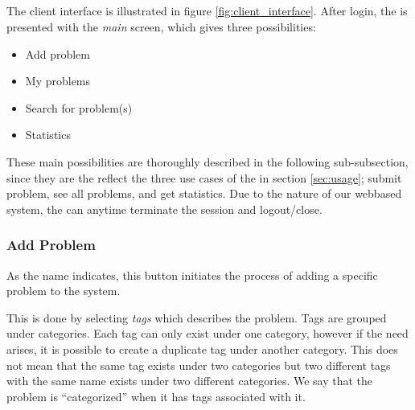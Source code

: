 \subsection{\cinterface}
\label{sec:client_interface}

The client interface is illustrated in figure \ref{fig:client_interface}.
After login, the \aclient[] is presented with the \textit{main} screen, which gives three possibilities:
\begin{itemize}
	\item Add problem
	\item My problems
	\item Search for problem(s)
	\item Statistics
\end{itemize}

These main possibilities are thoroughly described in the following sub-subsection, since they are the reflect the three use cases of the \aclient[] in section \ref{sec:usage}; submit problem, see all problems, and get statistics.
Due to the nature of our webbased system, the \aclient[] can anytime terminate the session and logout/close.

\subsubsection{Add Problem}
As the name indicates, this button initiates the process of adding a specific problem to the system.

This is done by selecting \textit{tags} which describes the problem. Tags are grouped under categories. Each tag can only exist under one category, however if the need arises, it is possible to create a duplicate tag under another category. This does not mean that the same tag exists under two categories but two different tags with the same name exists under two different categories.
We say that the problem is ``categorized'' when it has tags associated with it.

